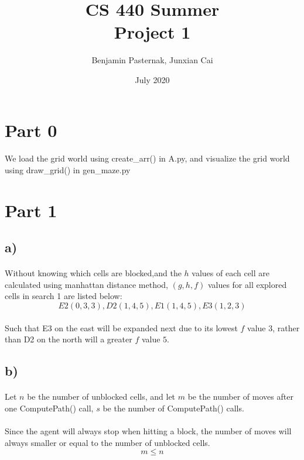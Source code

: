 \documentclass{article}
\title{CS 440 Summer \\ Project 1}
\author{Benjamin Pasternak, Junxian Cai}
\date{July 2020}
\begin{document}
\maketitle

\section*{Part 0}
\paragraph*{}
We load the grid world using create\_arr() in A.py, and visualize the grid world using draw\_grid() in gen\_maze.py

\section*{Part 1}

\subsection*{a)}
\paragraph*{}
\raggedright
Without knowing which cells are blocked,and the $h$ values of each cell are calculated using manhattan distance method, $(g, h, f)$ values for all explored cells in search 1 are listed below:\\
$$E2(0, 3, 3), D2(1, 4, 5), E1(1, 4, 5), E3(1, 2, 3)$$
\paragraph*{}
Such that E3 on the east will be expanded next due to its lowest $f$ value $3$, rather than D2 on the north will a greater $f$ value $5$.

\subsection*{b)}
\paragraph*{}
Let $n$ be the number of unblocked cells, and let $m$ be the number of moves after one ComputePath() call, $s$ be the number of ComputePath() calls.

\paragraph*{}
Since the agent will always stop when hitting a block, the number of moves will always smaller or equal to the number of unblocked cells.
$$m \le n$$
\end{document}
